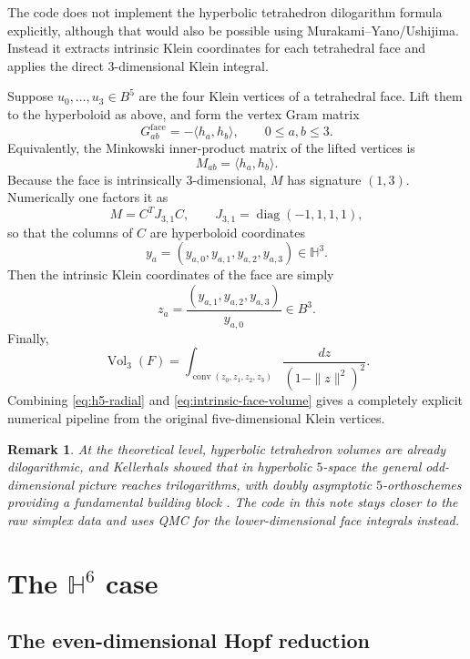 \documentclass[11pt]{article}
\newtheorem{remark}{Remark}
\newcommand{\Hh}{\mathbb{H}}
\newcommand{\Vol}{\operatorname{Vol}}
\newcommand{\conv}{\operatorname{conv}}
\newcommand{\diag}{\operatorname{diag}}
\begin{document}
The code does not implement the hyperbolic tetrahedron dilogarithm formula explicitly,
although that would also be possible using Murakami--Yano/Ushijima.
Instead it extracts intrinsic Klein coordinates for each tetrahedral face and applies the direct
$3$-dimensional Klein integral.

Suppose $u_0,\dots,u_3\in B^5$ are the four Klein vertices of a tetrahedral face.  Lift them to the
hyperboloid as above, and form the vertex Gram matrix
\[
G^{\mathrm{face}}_{ab}=-\langle h_a,h_b\rangle,\qquad 0\le a,b\le 3.
\]
Equivalently, the Minkowski inner-product matrix of the lifted vertices is
\[
M_{ab}=\langle h_a,h_b\rangle.
\]
Because the face is intrinsically $3$-dimensional, $M$ has signature $(1,3)$.  Numerically one
factors it as
\[
M=C^{T}J_{3,1}C,
\qquad
J_{3,1}=\diag(-1,1,1,1),
\]
so that the columns of $C$ are hyperboloid coordinates
\[
 y_a=(y_{a,0},y_{a,1},y_{a,2},y_{a,3})\in \Hh^3.
\]
Then the intrinsic Klein coordinates of the face are simply
\begin{equation}
\label{eq:intrinsic-klein-face}
 z_a=\frac{(y_{a,1},y_{a,2},y_{a,3})}{y_{a,0}}\in B^3.
\end{equation}
Finally,
\begin{equation}
\label{eq:intrinsic-face-volume}
\Vol_3(F)=\int_{\conv(z_0,z_1,z_2,z_3)}\frac{dz}{(1-\|z\|^2)^2}.
\end{equation}
Combining \eqref{eq:h5-radial} and \eqref{eq:intrinsic-face-volume} gives a completely explicit
numerical pipeline from the original five-dimensional Klein vertices.

\begin{remark}
At the theoretical level, hyperbolic tetrahedron volumes are already dilogarithmic, and Kellerhals
showed that in hyperbolic $5$-space the general odd-dimensional picture reaches trilogarithms,
with doubly asymptotic $5$-orthoschemes providing a fundamental building block
\cite{Kellerhals5,MY,Ushijima}.  The code in this note stays closer to the raw simplex data and uses
QMC for the lower-dimensional face integrals instead.
\end{remark}

\section{The $\Hh^6$ case}

\subsection*{The even-dimensional Hopf reduction}
\end{document}
